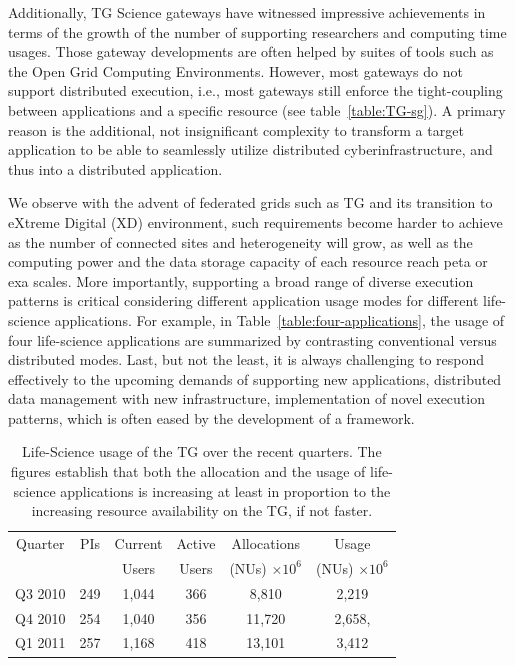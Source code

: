 \documentclass[]{article}
\begin{document}
Additionally, TG Science gateways have witnessed impressive
achievements in terms of the growth of the number of supporting
researchers and computing time usages.  Those gateway developments are
often helped by suites of tools such as the Open Grid Computing
Environments\cite{ogce-2010}.  However, most gateways do not support
distributed execution, i.e., most gateways still enforce the
tight-coupling between applications and a specific resource (see
table~\ref{table:TG-sg}).  A primary reason is the additional, not
insignificant complexity to transform a target application to be able
to seamlessly utilize distributed cyberinfrastructure, and thus into a
distributed application.


We observe with the advent of federated grids such as TG and its
transition to eXtreme Digital (XD) environment, such requirements
become harder to achieve as the number of connected sites and
heterogeneity will grow, as well as the computing power and the data
storage capacity of each resource reach peta or exa scales.  More
importantly, supporting a broad range of diverse execution patterns is
critical considering different application usage modes for different
life-science applications.  For example, in
Table~\ref{table:four-applications}, the usage of four life-science
applications are summarized by contrasting conventional versus
distributed modes.  Last, but not the least, it is always challenging
to respond effectively to the upcoming demands of supporting new
applications, distributed data management with new infrastructure,
implementation of novel execution patterns, which is often eased by
the development of a framework.


\begin{table}
 \small
\begin{tabular}{|c|c|c|c|c|c|} 
  \hline  Quarter & PIs & Current & Active & Allocations  & Usage\\
  & & Users  &  Users & (NUs) $\times 10^6$& (NUs) $\times 10^6$ \\ \hline
  Q3 2010 & 249 & 1,044 & 366 & 8,810   & 2,219  \\ \hline
  Q4 2010 & 254 & 1,040 & 356 & 11,720  & 2,658, \\ \hline
  Q1 2011 & 257 & 1,168 & 418 & 13,101  & 3,412\\ \hline 
\end{tabular} 
\caption{Life-Science usage of the TG over the recent
  quarters. The figures establish that both the  allocation and the
  usage of life-science applications is increasing at least in
  proportion to the increasing resource availability on the TG,
  if not faster.}
 \label{tg2011} 
\end{table}
\end{document}
